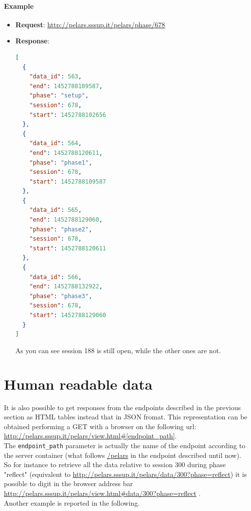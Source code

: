 \documentclass[a4paper,notitlepage,onecolumn]{hitec}  %
\begin{document}
\paragraph{Example}
\begin{itemize}
\item \textbf{Request}:  \url{http://pelars.sssup.it/pelars/phase/678} 
\item \textbf{Response}: 
\begin{lstlisting}[language=json,firstnumber=1]
[
  {
    "data_id": 563,
    "end": 1452788109587,
    "phase": "setup",
    "session": 678,
    "start": 1452788102656
  },
  {
    "data_id": 564,
    "end": 1452788120611,
    "phase": "phase1",
    "session": 678,
    "start": 1452788109587
  },
  {
    "data_id": 565,
    "end": 1452788129060,
    "phase": "phase2",
    "session": 678,
    "start": 1452788120611
  },
  {
    "data_id": 566,
    "end": 1452788132922,
    "phase": "phase3",
    "session": 678,
    "start": 1452788129060
  }
]
\end{lstlisting}
As you can see session 188 is still open, while the other ones are not.
\end{itemize}

\section{Human readable data}
It is also possible to get responses from the endpoints described in the previous section as HTML tables instead that in JSON fromat. This representation can be obtained performing a GET with a browser on the following url: \url{http://pelars.sssup.it/pelars/view.html#[endpoint_path]}.\\
The {\tt endpoint\_path} parameter is actually the name of the endpoint according to the server container (what follows \url{/pelars} in the endpoint described until now).
So for instance to retrieve all the data relative to session 300 during phase "reflect" (equivalent to \url{http://pelars.sssup.it/pelars/data/300?phase=reflect}) it is possible to digit in the browser address bar \\ \url{http://pelars.sssup.it/pelars/view.html#data/300?phase=reflect}
.\\Another example is reported in the following.
\end{document}
